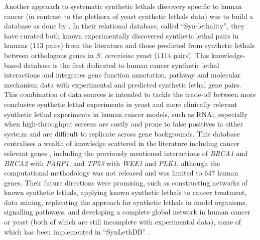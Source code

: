 Another approach to systematic \glspl{synthetic lethal} discovery specific to human cancer (in contrast to the plethora of yeast \glspl{synthetic lethal} data) was to build a database as done by \citet{Li2014}. In their relational database, called ``Syn-lethality'', they have curated both known experimentally discovered \gls{synthetic lethal} pairs in humans (113 pairs) from the literature and those predicted from \glspl{synthetic lethal} between orthologous genes in \textit{S. cerevisiae} yeast (1114 pairs). This knowledge-based database is the first dedicated to human cancer \gls{synthetic lethal} interactions and integrates gene function annotation, \gls{pathway} and molecular mechanism data with experimental and predicted \gls{synthetic lethal} gene pairs. This combination of data sources is intended to tackle the trade-off between more conclusive \gls{synthetic lethal} experiments in yeast and more clinically relevant \gls{synthetic lethal} experiments in human cancer models, such as \gls{RNAi}, especially when high-throughput screens are costly and prone to false positives in either syste,m and are difficult to replicate across gene backgrounds. This database centralises a wealth of knowledge scattered in the literature including cancer relevant genes%
, including the previously mentioned interactions of \textit{BRCA1} and \textit{BRCA2} with \textit{PARP1}, and \textit{TP53} with \textit{WEE1} and \textit{PLK1}, although the computational methodology was not released %
and was limited to 647 human genes. Their future directions were promising, such as constructing networks of known \glspl{synthetic lethal}, applying known \glspl{synthetic lethal} to cancer treatment, data mining, replicating the approach for \glspl{synthetic lethal} in model organisms, signalling pathways, and developing a complete global network in human cancer or yeast (both of which are still incomplete with experimental data), some of which has been implemented in ``SynLethDB'' \citep{Guo2016}.  


